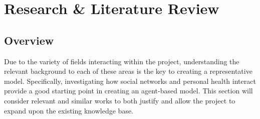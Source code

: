 \documentclass[]{report}
\begin{document}
%
%

%
%
\chapter{Research \& Literature Review}

\section{Overview}
Due to the variety of fields interacting within the project, understanding the relevant background to each of these areas is the key to creating a representative model. Specifically, investigating how social networks and personal health interact provide a good starting point in creating an agent-based model. This section will consider relevant and similar works to both justify and allow the project to expand upon the existing knowledge base.
\end{document}
